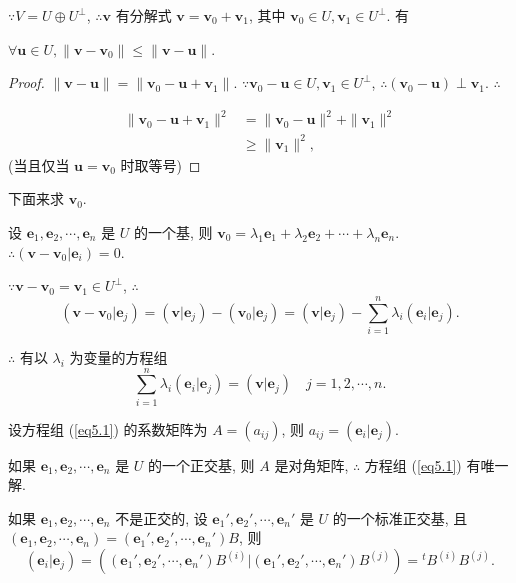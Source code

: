 \documentclass{ctexart}
\begin{document}
$\because V=U\oplus U^\perp$, $\therefore\boldsymbol{v}$ 有分解式 $\boldsymbol{v}=\boldsymbol{v}_0+\boldsymbol{v}_1$, 其中 $\boldsymbol{v}_0\in U,\boldsymbol{v}_1\in U^\perp$. 有
\begin{theorem}\label{t5.1}
    $\forall\boldsymbol{u}\in U,\|\boldsymbol{v}-\boldsymbol{v}_0\|\leq\|\boldsymbol{v}-\boldsymbol{u}\|$.
\end{theorem}
\begin{proof}
    $\|\boldsymbol{v}-\boldsymbol{u}\|=\|\boldsymbol{v}_0-\boldsymbol{u}+\boldsymbol{v}_1\|$. $\because\boldsymbol{v}_0-\boldsymbol{u}\in U,\boldsymbol{v}_1\in U^\perp$, $\therefore(\boldsymbol{v}_0-\boldsymbol{u})\perp\boldsymbol{v}_1$. $\therefore$

    \begin{align*}
        \|\boldsymbol{v}_0-\boldsymbol{u}+\boldsymbol{v}_1\|^2 & =\|\boldsymbol{v}_0-\boldsymbol{u}\|^2+\|\boldsymbol{v}_1\|^2 \\
        & \geq\|\boldsymbol{v}_1\|^2,
    \end{align*}
    (当且仅当 $\boldsymbol{u}=\boldsymbol{v}_0$ 时取等号)
\end{proof}
下面来求 $\boldsymbol{v}_0$.

设 $\boldsymbol{e}_1,\boldsymbol{e}_2,\cdots,\boldsymbol{e}_n$ 是 $U$ 的一个基, 则 $\boldsymbol{v}_0=\lambda_1\boldsymbol{e}_1+\lambda_2\boldsymbol{e}_2+\cdots+\lambda_n\boldsymbol{e}_n$. $\therefore(\boldsymbol{v}-\boldsymbol{v}_0|\boldsymbol{e}_i)=0$.

$\because\boldsymbol{v}-\boldsymbol{v}_0=\boldsymbol{v}_1\in U^\perp$, $\therefore$
\[(\boldsymbol{v}-\boldsymbol{v}_0|\boldsymbol{e}_j)=(\boldsymbol{v}|\boldsymbol{e}_j)-(\boldsymbol{v}_0|\boldsymbol{e}_j)=(\boldsymbol{v}|\boldsymbol{e}_j)-\sum\limits_{i=1}^n\lambda_i(\boldsymbol{e}_i|\boldsymbol{e}_j).\]

$\therefore$ 有以 $\lambda_i$ 为变量的方程组
\begin{equation}\label{eq5.1}
    \sum\limits_{i=1}^n\lambda_i(\boldsymbol{e}_i|\boldsymbol{e}_j)=(\boldsymbol{v}|\boldsymbol{e}_j)\quad j=1,2,\cdots,n.
\end{equation}

设方程组 (\ref{eq5.1}) 的系数矩阵为 $A=(a_{ij})$, 则 $a_{ij}=(\boldsymbol{e}_i|\boldsymbol{e}_j)$.

如果 $\boldsymbol{e}_1,\boldsymbol{e}_2,\cdots,\boldsymbol{e}_n$ 是 $U$ 的一个正交基, 则 $A$ 是对角矩阵, $\therefore$ 方程组 (\ref{eq5.1}) 有唯一解.

如果 $\boldsymbol{e}_1,\boldsymbol{e}_2,\cdots,\boldsymbol{e}_n$ 不是正交的, 设 $\boldsymbol{e}_1',\boldsymbol{e}_2',\cdots,\boldsymbol{e}_n'$ 是 $U$ 的一个标准正交基, 且 $(\boldsymbol{e}_1,\boldsymbol{e}_2,\cdots,\boldsymbol{e}_n)=(\boldsymbol{e}_1',\boldsymbol{e}_2',\cdots,\boldsymbol{e}_n')B$, 则
\[(\boldsymbol{e}_i|\boldsymbol{e}_j)=\left((\boldsymbol{e}_1',\boldsymbol{e}_2',\cdots,\boldsymbol{e}_n')B^{(i)}\Big|(\boldsymbol{e}_1',\boldsymbol{e}_2',\cdots,\boldsymbol{e}_n')B^{(j)}\right)={}^tB^{(i)}B^{(j)}.\]
\end{document}
